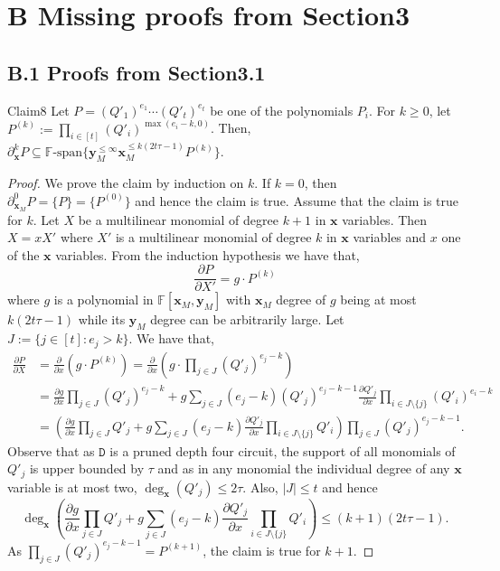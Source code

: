 \section*{B Missing proofs from Section3}
\subsection*{B.1 Proofs from Section3.1}
\begin{authorclaim}{Claim8}
Let $P=(Q'_1)^{e_1}\cdots(Q'_t)^{e_t}$ be one of the polynomials $P_i$. For $k\ge0$, let $P^{(k)}:=\prod_{i\in[t]}(Q'_i)^{\max(e_i-k,0)}$. Then, $\partial_{\mathbf x}^kP\subseteq\mathbb F\text{-span}\{\mathbf y_M^{\le\infty}\mathbf x_M^{\le k(2t\tau-1)}P^{(k)}\}$.
\end{authorclaim}
\begin{proof}
We prove the claim by induction on $k$. If $k=0$, then $\partial_{\mathbf x_M}^0P=\{P\}=\{P^{(0)}\}$ and hence the claim is true. Assume that the claim is true for $k$. Let $X$ be a multilinear monomial of degree $k+1$ in $\mathbf x$ variables. Then $X=xX'$ where $X'$ is a multilinear monomial of degree $k$ in $\mathbf x$ variables and $x$ one of the $\mathbf x$ variables. From the induction hypothesis we have that,
\[
\frac{\partial P}{\partial X'}=g\cdot P^{(k)}
\]
where $g$ is a polynomial in $\mathbb F[\mathbf x_M,\mathbf y_M]$ with $\mathbf x_M$ degree of $g$ being at most $k(2t\tau-1)$ while its $\mathbf y_M$ degree can be arbitrarily large.
Let $J:=\{j\in[t]:e_j>k\}$. We have that,
\begin{align*}
\frac{\partial P}{\partial X}
&=\frac{\partial}{\partial x}(g\cdot P^{(k)})
=\frac{\partial}{\partial x}\left(g\cdot\prod_{j\in J}(Q'_j)^{e_j-k}\right)\\
&=\frac{\partial g}{\partial x}\prod_{j\in J}(Q'_j)^{e_j-k}
+g\sum_{j\in J}(e_j-k)(Q'_j)^{e_j-k-1}\frac{\partial Q'_j}{\partial x}
\prod_{i\in J\setminus\{j\}}(Q'_i)^{e_i-k}\\
&=\left(\frac{\partial g}{\partial x}\prod_{j\in J}Q'_j
+g\sum_{j\in J}(e_j-k)\frac{\partial Q'_j}{\partial x}
\prod_{i\in J\setminus\{j\}}Q'_i\right)
\prod_{j\in J}(Q'_j)^{e_j-k-1}.
\end{align*}
Observe that as $\mathtt D$ is a pruned depth four circuit, the support of all monomials of $Q'_j$ is upper bounded by $\tau$ and as in any monomial the individual degree of any $\mathbf x$ variable is at most two, $\deg_{\mathbf x}(Q'_j)\le2\tau$. Also, $|J|\le t$ and hence
\[
\deg_{\mathbf x}\left(\frac{\partial g}{\partial x}\prod_{j\in J}Q'_j
+g\sum_{j\in J}(e_j-k)\frac{\partial Q'_j}{\partial x}
\prod_{i\in J\setminus\{j\}}Q'_i\right)\le(k+1)(2t\tau-1).
\]
As $\prod_{j\in J}(Q'_j)^{e_j-k-1}=P^{(k+1)}$, the claim is true for $k+1$.
\end{proof}
